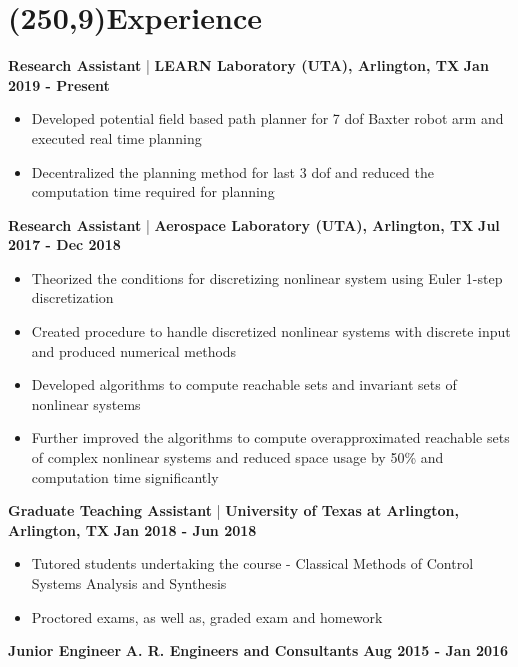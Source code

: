 \documentclass[10pt,a4paper]{extarticle}
\begin{document}
\vspace{-0.2cm}

\section*{\colorbox{gray!10}{\makebox(250,9){\textcolor{blue!65}{Experience\hfill}}}}
\textbf{Research Assistant} | \textbf{LEARN Laboratory (UTA), Arlington, TX} \hfill \textbf{Jan 2019 - Present}
\vspace{-0.5em}
\begin{itemize}[leftmargin = 0.6cm]
\setlength\itemsep{-0.2em}
\item Developed potential field based path planner for 7 dof Baxter robot arm and executed real time planning
\item Decentralized the planning method for last 3 dof and reduced the computation time required for planning
\end{itemize}
\textbf{Research Assistant} | \textbf{Aerospace Laboratory (UTA), Arlington, TX} \hfill \textbf{Jul 2017 - Dec 2018}
\vspace{-0.5em}
\begin{itemize}[leftmargin = 0.6cm]
\setlength\itemsep{-0.2em}
\item Theorized the conditions for discretizing nonlinear system using Euler 1-step discretization
\item Created procedure to handle discretized nonlinear systems with discrete input and produced numerical methods
\item Developed algorithms to compute reachable sets and invariant sets of nonlinear systems%
\item Further improved the algorithms to compute overapproximated reachable sets of complex nonlinear systems and reduced space usage by 50\% and computation time significantly
\end{itemize}
\textbf{Graduate Teaching Assistant} | \textbf{University of Texas at Arlington, Arlington, TX} \hfill \textbf{Jan 2018 - Jun 2018}
\vspace{-0.5em}
\begin{itemize}[leftmargin = 0.6cm]
\setlength\itemsep{-0.2em}
\item Tutored students undertaking the course - Classical Methods of Control Systems Analysis and Synthesis
\item Proctored exams, as well as, graded exam and homework
\end{itemize}
\iffalse
\textbf{Junior Engineer} \hspace{4.95cm} \textbf{A. R. Engineers and Consultants} \hfill\textbf{Aug 2015 - Jan 2016}
\end{document}
